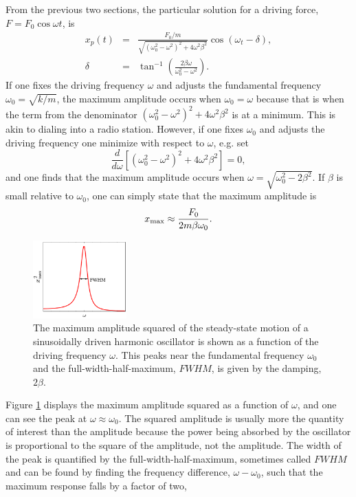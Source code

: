From the previous two sections, the particular solution for a driving force, $F=F_0\cos\omega t$, is
\begin{eqnarray}
x_p(t)&=&\frac{F_0/m}{\sqrt{(\omega_0^2-\omega^2)^2+4\omega^2\beta^2}}\cos(\omega_t-\delta),\\
\nonumber
\delta&=&\tan^{-1}\left(\frac{2\beta\omega}{\omega_0^2-\omega^2}\right).
\end{eqnarray}
If one fixes the driving frequency $\omega$ and adjusts the fundamental frequency $\omega_0=\sqrt{k/m}$, the maximum amplitude occurs when $\omega_0=\omega$ because that is when the term from the denominator $(\omega_0^2-\omega^2)^2+4\omega^2\beta^2$ is at a minimum. This is akin to dialing into a radio station. However, if one fixes $\omega_0$ and adjusts the driving frequency one minimize with respect to $\omega$, e.g. set 
\begin{equation}
\frac{d}{d\omega}\left[(\omega_0^2-\omega^2)^2+4\omega^2\beta^2\right]=0,
\end{equation}
and one finds that the maximum amplitude occurs when $\omega=\sqrt{\omega_0^2-2\beta^2}$. If $\beta$ is small relative to $\omega_0$, one can simply state that the maximum amplitude is
\begin{equation}
x_{\rm max}\approx\frac{F_0}{2m\beta \omega_0}.
\end{equation}
\begin{figure}
\centerline{\includegraphics[width=0.32\textwidth]{figs/qfactor}}
\caption{\label{fig:qfactor}
The maximum amplitude squared of the steady-state motion of a sinusoidally driven harmonic oscillator is shown as a function of the driving frequency $\omega$. This peaks near the fundamental frequency $\omega_0$ and the full-width-half-maximum, $FWHM$, is given by the damping, $2\beta$.}
\end{figure}
Figure \ref{fig:qfactor} displays the maximum amplitude squared as a function of $\omega$, and  one can see the peak at $\omega\approx\omega_0$. The squared amplitude is usually more the quantity of interest than the amplitude because the power being absorbed by the oscillator is proportional to the square of the amplitude, not the amplitude. The width of the peak is quantified by the full-width-half-maximum, sometimes called $FWHM$ and can be found by finding the frequency difference, $\omega-\omega_0$, such that the maximum response falls by a factor of two,
